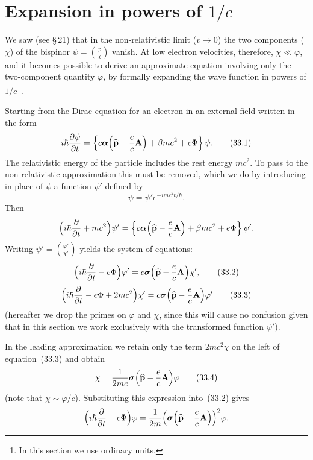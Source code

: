 \section{Expansion in powers of \texorpdfstring{$1/c$}{1/c}}

We saw (see \S\,21) that in the non-relativistic limit ($v \to 0$) the two components ($\chi$) of the bispinor $\psi = \binom{\varphi}{\chi}$ vanish. At low electron velocities, therefore, $\chi \ll \varphi$, and it becomes possible to derive an approximate equation involving only the two-component quantity $\varphi$, by formally expanding the wave function in powers of $1/c$\,\footnote{In this section we use ordinary units.}.

Starting from the Dirac equation for an electron in an external field written in the form
\begin{equation}
i\hbar\frac{\partial\psi}{\partial t} = \left\{c\boldsymbol{\alpha}\Bigl(\widehat{\mathbf{p}} - \frac{e}{c}\mathbf{A}\Bigr) + \beta mc^2 + e\Phi\right\}\psi.
\tag{33.1}
\end{equation}
The relativistic energy of the particle includes the rest energy $mc^2$. To pass to the non-relativistic approximation this must be removed, which we do by introducing in place of $\psi$ a function $\psi'$ defined by
\[
\psi = \psi'e^{-imc^2t/\hbar}.
\]
Then
\[
\Bigl(i\hbar\frac{\partial}{\partial t} + mc^2\Bigr)\psi' = \left\{c\boldsymbol{\alpha}\Bigl(\widehat{\mathbf{p}} - \frac{e}{c}\mathbf{A}\Bigr) + \beta mc^2 + e\Phi\right\}\psi'.
\]
Writing $\psi' = \binom{\varphi'}{\chi'}$ yields the system of equations:
\begin{equation}
\Bigl(i\hbar\frac{\partial}{\partial t} - e\Phi\Bigr)\varphi' = c\boldsymbol{\sigma}\Bigl(\widehat{\mathbf{p}} - \frac{e}{c}\mathbf{A}\Bigr)\chi',
\tag{33.2}
\end{equation}
\begin{equation}
\Bigl(i\hbar\frac{\partial}{\partial t} - e\Phi + 2mc^2\Bigr)\chi' = c\boldsymbol{\sigma}\Bigl(\widehat{\mathbf{p}} - \frac{e}{c}\mathbf{A}\Bigr)\varphi'
\tag{33.3}
\end{equation}
(hereafter we drop the primes on $\varphi$ and $\chi$, since this will cause no confusion given that in this section we work exclusively with the transformed function $\psi'$).

In the leading approximation we retain only the term $2mc^2\chi$ on the left of equation~(33.3) and obtain
\begin{equation}
\chi = \frac{1}{2mc}\boldsymbol{\sigma}\Bigl(\widehat{\mathbf{p}} - \frac{e}{c}\mathbf{A}\Bigr)\varphi
\tag{33.4}
\end{equation}
(note that $\chi \sim \varphi/c$). Substituting this expression into~(33.2) gives
\[
\Bigl(i\hbar\frac{\partial}{\partial t} - e\Phi\Bigr)\varphi = \frac{1}{2m}\Bigl(\boldsymbol{\sigma}\Bigl(\widehat{\mathbf{p}} - \frac{e}{c}\mathbf{A}\Bigr)\Bigr)^2\varphi.
\]

